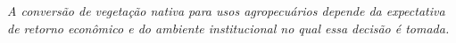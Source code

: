 \noindent\emph{A conversão de vegetação nativa para usos agropecuários depende da expectativa de retorno econômico e do ambiente institucional no qual essa decisão é tomada.}

\medskip

%
%
%



%
%

